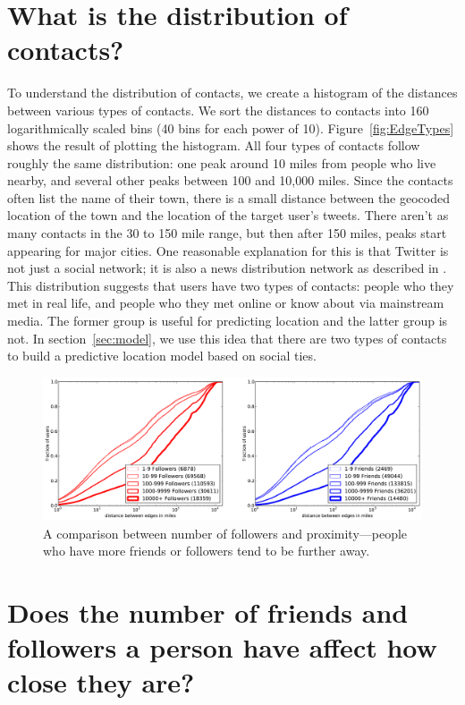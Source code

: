 \section{What is the distribution of contacts?}

To understand the distribution of contacts, we create a histogram of the
distances between various types of contacts.
We sort the distances to contacts into 160 logarithmically
scaled bins (40 bins for each power of 10).
%
Figure~\ref{fig:EdgeTypes} shows the result of plotting the histogram.
%
All four types of contacts follow roughly the same
distribution: one peak around 10 miles from people who live nearby, and several
other peaks between 100 and 10,000 miles.
%
Since the contacts often list the name of their town, there is a small distance
between the geocoded location of the town and the location of the target
user's tweets.
%
There aren't as many contacts in the 30 to 150 mile range, but then after 150
miles, peaks start appearing for major cities.
%
One reasonable explanation for this is that Twitter is not just a social
network; it is also a news distribution network as described in
\cite{kwak2010why}.
%
This distribution suggests that users have two types of contacts: people who
they met in real life, and people who they met online or know about via
mainstream media.
%
The former group is useful for predicting location and the latter group is not.
%
In section~\ref{sec:model}, we use this idea that there are two types of
contacts to build a predictive location model based on social ties.


\begin{figure}[tbh]
\centering
\includegraphics[width=\linewidth]{figures/edge_counts.pdf}
\caption{
A comparison between number of followers and proximity---people who have more
friends or followers tend to be further away.
}
\label{fig:EdgeCounts}
\end{figure}

\section{Does the number of friends and followers a person have affect how
close they are?}

